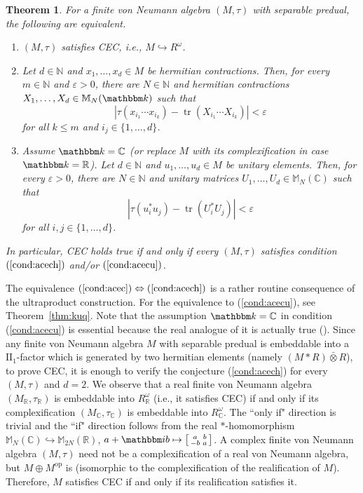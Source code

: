 \documentclass[12pt]{amsart}
\newtheorem{thm}{Theorem}
\theoremstyle{definition}
\begin{document}
\begin{thm}\label{thm:cecequiv}
For a finite von Neumann algebra $(M,\tau)$ with separable predual,
the following are equivalent.
\begin{enumerate}[$(1)$]
\item\label{cond:acec}
$(M,\tau)$ satisfies CEC, i.e., $M\hookrightarrow R^\omega$.
\item\label{cond:acech}
Let $d\in{{\mathbb N}}$ and $x_1,\ldots,x_d\in M$ be hermitian contractions.
Then, for every $m\in{{\mathbb N}}$ and ${\varepsilon}>0$, there are $N\in{{\mathbb N}}$ and
hermitian contractions $X_1,\ldots,X_d \in{{\mathbb M}}_N({{\mathbbm k}})$ such that
\[
|\tau(x_{i_1}\cdots x_{i_k}) - \operatorname*{tr}(X_{i_1}\cdots X_{i_k})|<{\varepsilon}
\]
for all $k\le m$ and $i_j\in\{1,\ldots,d\}$.
\item\label{cond:acecu}
Assume ${{\mathbbm k}}={{\mathbb C}}$ (or replace $M$ with its complexification in case ${{\mathbbm k}}={{\mathbb R}}$).
Let $d\in{{\mathbb N}}$ and $u_1,\ldots,u_d\in M$ be unitary elements.
Then, for every ${\varepsilon}>0$, there are $N\in{{\mathbb N}}$ and
unitary matrices $U_1,\ldots,U_d \in{{\mathbb M}}_N({{\mathbb C}})$ such that
\[
|\tau(u_i^*u_j) - \operatorname*{tr}(U_i^*U_j)|<{\varepsilon}
\]
for all $i,j\in\{1,\ldots,d\}$.
\end{enumerate}
In particular, CEC holds true if and only if every $(M,\tau)$ satisfies
condition $(\ref{cond:acech})$ and/or $(\ref{cond:acecu})$.
\end{thm}

The equivalence $(\ref{cond:acec})\Leftrightarrow(\ref{cond:acech})$ is
a rather routine consequence of the ultraproduct construction.
For the equivalence to (\ref{cond:acecu}), see Theorem~\ref{thm:kuq}.
Note that the assumption ${{\mathbbm k}}={{\mathbb C}}$ in condition (\ref{cond:acecu}) is essential
because the real analogue of it is actually true (\cite{dj}).
Since any finite von Neumann algebra $M$ with separable predual
is embeddable into a $\mathrm{II}_1$-factor which is generated by
two hermitian elements (namely $(M*R) \mathbin{\bar{\otimes}} R$),
to prove CEC, it is enough to verify the conjecture (\ref{cond:acech})
for every $(M,\tau)$ and $d=2$.
We observe that a real finite von Neumann algebra $(M_{{\mathbb R}},\tau_{{\mathbb R}})$
is embeddable into $R_{{\mathbb R}}^\omega$ (i.e., it satisfies CEC)
if and only if its complexification $(M_{{\mathbb C}},\tau_{{\mathbb C}})$
is embeddable into $R_{{\mathbb C}}^\omega$. The ``only if" direction is trivial and
the ``if" direction follows from the real {$*$-homo\-mor\-phism\xspace}
${{\mathbb M}}_N({{\mathbb C}})\hookrightarrow{{\mathbb M}}_{2N}({{\mathbb R}})$,
$a+{{\mathbbm i}} b\mapsto\left[\begin{smallmatrix} a & b \\ -b & a\end{smallmatrix}\right]$.
A complex finite von Neumann algebra $(M,\tau)$ need not be
a complexification of a real von Neumann algebra, but $M\oplus M^{\mathrm{op}}$ is
(isomorphic to the complexification of the realification of $M$).
Therefore, $M$ satisfies CEC if and only if its realification satisfies it.
\end{document}
